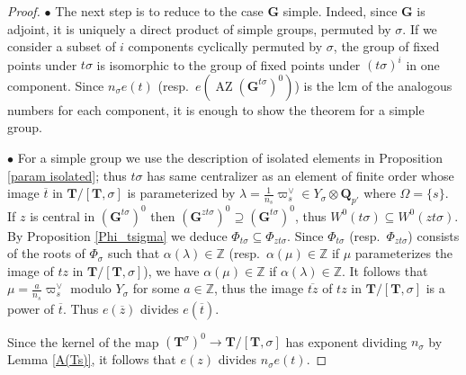 \documentclass{amsart}
\numberwithin{equation}{section}
\theoremstyle{definition}
\theoremstyle{remark}
\newcommand\bG{{\mathbf G}}
\newcommand\bQ{{\mathbf Q}}
\newcommand\bT{{\mathbf T}}
\newcommand\BZ{{\mathbb Z}}
\newcommand\Gtso{{(\bG^{t\sigma})^0}}
\newcommand\Tso{{(\bT^\sigma)^0}}
\newcommand\LT{{\bT/[\bT,\sigma]}}
\DeclareMathOperator\AZ{\mathrm{AZ}}
\begin{document}
\begin{proof}
$\bullet$ The next step is to reduce to the case $\bG$ simple. Indeed,
since $\bG$ is adjoint, it is uniquely a direct product of simple groups,
permuted by $\sigma$. If we consider a subset of $i$ components
cyclically permuted by $\sigma$, the group of fixed points under $t\sigma$ is
isomorphic to the group of fixed points under $(t\sigma)^i$ in one component.
Since $n_\sigma e(t)$ (resp.~$e(\AZ\Gtso)$) is the lcm of the analogous numbers
for each component, it is enough to show the theorem for a simple group.

$\bullet$ For a simple group we use the description of isolated elements in
Proposition \ref{param  isolated}; thus $t\sigma$ has same centralizer as an element of
finite  order  whose  image  $\overline  t$  in  $\LT$  is parameterized by
$\lambda=\frac1{n_s}\varpi_s^\vee\in    Y_\sigma\otimes\bQ_{p'}$   where
$\Omega=\{s\}$. If  $z$  is
central  in  $\Gtso$ then $(\bG^{zt\sigma})^0\supseteq\Gtso$, 
thus  $W^0(t\sigma)\subseteq W^0(zt\sigma)$. By 
Proposition \ref{Phi_tsigma} we deduce $\Phi_{t\sigma}\subseteq\Phi_{zt\sigma}$.
Since $\Phi_{t\sigma}$ (resp.~$\Phi_{zt\sigma}$)
consists of  the roots  of $\Phi_\sigma$ such that $\alpha(\lambda)\in\BZ$
(resp.~$\alpha(\mu)\in\BZ$ if $\mu$ parameterizes the  image of $tz$ in $\LT$),
we have  $\alpha(\mu)\in\BZ$ if $\alpha(\lambda)\in\BZ$.
It   follows   that  $\mu=\frac  a{n_s}\varpi_s^\vee$  modulo
$Y_\sigma$  for some $a\in\BZ$, thus the image $\overline {tz}$
of $tz$ in $\LT$ is a power of $\overline
t$. Thus $e(\overline z)$ divides $e(\overline t)$.

Since the kernel of the map $\Tso\to\LT$ has exponent dividing $n_\sigma $
by Lemma \ref{A(Ts)}, it follows that $e(z)$ divides $n_\sigma  e(t)$.
\end{proof}
\end{document}

